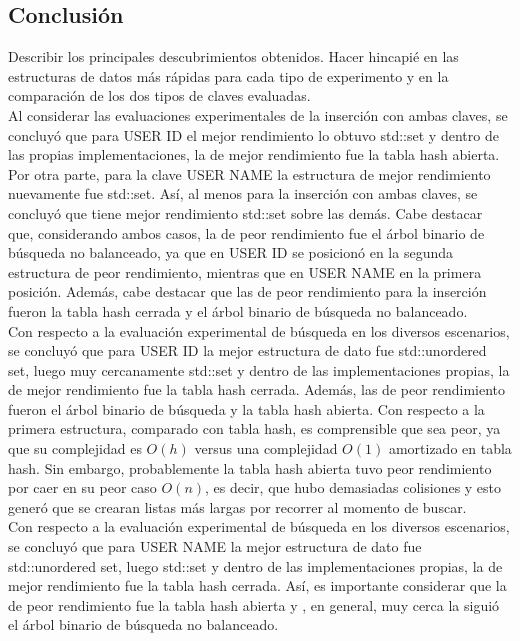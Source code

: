 \begin{multicols}{2}
\section{Conclusión}
Describir los principales descubrimientos obtenidos. Hacer hincapié en las estructuras de datos más rápidas para cada tipo de experimento y en la comparación de los dos tipos de claves evaluadas.\\
Al considerar las evaluaciones experimentales de la inserción con ambas claves, se concluyó que para USER ID el mejor rendimiento lo obtuvo std::set y dentro de las propias implementaciones, la de mejor rendimiento fue la tabla hash abierta. Por otra parte, para la clave USER NAME la estructura de mejor rendimiento nuevamente fue std::set. Así, al menos para la inserción con ambas claves, se concluyó que tiene mejor rendimiento std::set sobre las demás. Cabe destacar que, considerando ambos casos, la de peor rendimiento fue el árbol binario de búsqueda no balanceado, ya que en USER ID se posicionó en la segunda estructura de peor rendimiento, mientras que en USER NAME en la primera posición. Además, cabe destacar que las de peor rendimiento para la inserción fueron la tabla hash cerrada y el árbol binario de búsqueda no balanceado. \\
Con respecto a la evaluación experimental de búsqueda en los diversos escenarios, se concluyó que para USER ID la mejor estructura de dato fue std::unordered set, luego muy cercanamente std::set y dentro de las implementaciones propias, la de mejor rendimiento fue la tabla hash cerrada. Además, las de peor rendimiento fueron el árbol binario de búsqueda y la tabla hash abierta. Con respecto a la primera estructura, comparado con tabla hash, es comprensible que sea peor, ya que su complejidad es $O(h)$ versus una complejidad $O(1)$ amortizado en tabla hash. Sin embargo, probablemente la tabla hash abierta tuvo peor rendimiento por caer en su peor caso $O(n)$, es decir, que hubo demasiadas colisiones y esto generó que se crearan listas más largas por recorrer al momento de buscar.\\
Con respecto a la evaluación experimental de búsqueda en los diversos escenarios, se concluyó que para USER NAME la mejor estructura de dato fue std::unordered set, luego std::set y dentro de las implementaciones propias, la de mejor rendimiento fue la tabla hash cerrada. Así, es importante considerar que la de peor rendimiento fue la tabla hash abierta y , en general, muy cerca la siguió el árbol binario de búsqueda no balanceado.\\

\end{multicols}
